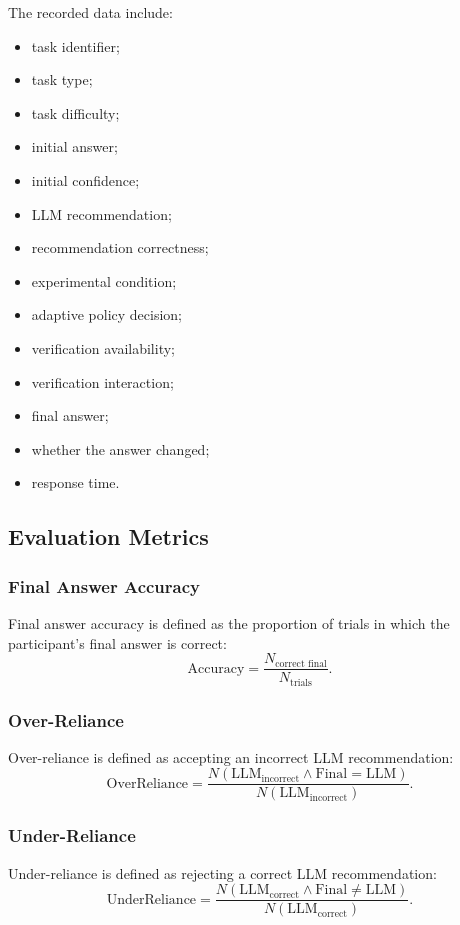 \documentclass[oneside,final,14pt,a4paper]{extreport}
\theoremstyle{definition}
\theoremstyle{remark}
\begin{document}
The recorded data include:
\begin{itemize}
    \item task identifier;
    \item task type;
    \item task difficulty;
    \item initial answer;
    \item initial confidence;
    \item LLM recommendation;
    \item recommendation correctness;
    \item experimental condition;
    \item adaptive policy decision;
    \item verification availability;
    \item verification interaction;
    \item final answer;
    \item whether the answer changed;
    \item response time.
\end{itemize}

\subsection{Evaluation Metrics}

\subsubsection{Final Answer Accuracy}
Final answer accuracy is defined as the proportion of trials in which the
participant's final answer is correct:
\[
\text{Accuracy}
=
\frac{N_{\text{correct final}}}{N_{\text{trials}}}.
\]

\subsubsection{Over-Reliance}
Over-reliance is defined as accepting an incorrect LLM recommendation:
\[
\text{OverReliance}
=
\frac{
N(\text{LLM}_{\text{incorrect}}
\land
\text{Final}=\text{LLM})
}{
N(\text{LLM}_{\text{incorrect}})
}.
\]

\subsubsection{Under-Reliance}
Under-reliance is defined as rejecting a correct LLM recommendation:
\[
\text{UnderReliance}
=
\frac{
N(\text{LLM}_{\text{correct}}
\land
\text{Final}\neq\text{LLM})
}{
N(\text{LLM}_{\text{correct}})
}.
\]
\end{document}
